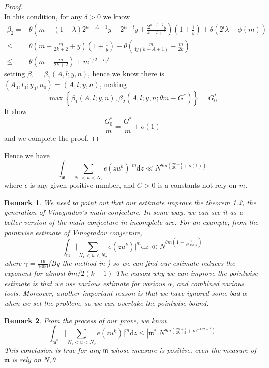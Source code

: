 \documentclass[10pt]{article}
\newtheorem{remark}{Remark}[section]
\begin{document}
\begin{proof}
\[\]
In this condition, for any $\delta>0$ we know
\begin{align*}
\beta_2=&\theta(m-(1-\lambda)2^{n-A+1}y-2^{n-l}y+\frac{2^{n-l-2}y}{k-l+1})(1+\frac{1}{y})+\theta(2^l\lambda-\phi(m))\\
\leq&\theta(m-\frac{m}{2k+2}+y)(1+\frac{1}{y})+\theta(\frac{m}{4y(k-A+1)}-\frac{m}{2k})\\
\leq&\theta(m-\frac{m}{2k+2})+m^{1/2+c_1\delta}
\end{align*}
setting $\beta_1=\beta_1(A,l;y,n)$, hence we know there is $(A_0,l_0;y_0,n_0)=(A,l;y,n)$, making
\[
\max\left\{\beta_1(A,l;y,n),\beta_2(A,l;y,n;\theta m-G^*)\right\}=G^*_0
\]
It show
\[
\frac{G^*_0}{m}=\frac{G^*}{m}+o(1)
\]
and we complete the proof.
\end{proof}
Hence we have
\[
\int_{\mathfrak{m}}\bigg|\sum\limits_{{N_1}<u<{N_2}}{e(zu^k)}\bigg|^{m}\mathrm{d}z\ll N^{\theta m(\frac{2k+1}{2k+2}+o(1))}
\]
where $\epsilon$ is any given positive number, and $C>0$ is a constants not rely on $m$.
\begin{remark}
We need to point out that our estimate improve the theorem 1.2, the generation of Vinogradov's main conjecture. In some way, we can see it as a better version of the main conjecture in incomplete arc. For an example, from the pointwise estimate of Vinogradov conjecture,
\[
\int_{\mathfrak{m}}\bigg|\sum\limits_{{N_1}<u<{N_2}}{e(zu^k)}\bigg|^{m}\mathrm{d}z\ll N^{\theta m(1-\frac{\gamma}{k^2\log k})}
\]
where $\gamma=\frac{19}{1600}$(By the method in \cite{PP1986}) so we can find our estimate reduces the exponent for almost $\theta m/2(k+1)$ The reason why we can improve the pointwise estimate is that we use various estimate for various $\alpha$, and combined various tools. Moreover, another important reason is that we have ignored some bad $\alpha$ when we set the problem, so we can overtake the pointwise bound.
\end{remark}
\begin{remark}
From the process of our prove, we know
\[
\int_{\mathfrak{m^*}}\bigg|\sum\limits_{{N_1}<u<{N_2}}{e(zu^k)}\bigg|^{m}\mathrm{d}z\leq|\mathfrak{m^*}|N^{\theta m(\frac{2k+1}{2k+2}+m^{-1/2-\delta})}
\]
This conclusion is true for any $\mathfrak{m}$ whose measure is positive, even the measure of $\mathfrak{m}$ is rely on $N,\theta$
\end{remark}
\end{document}
